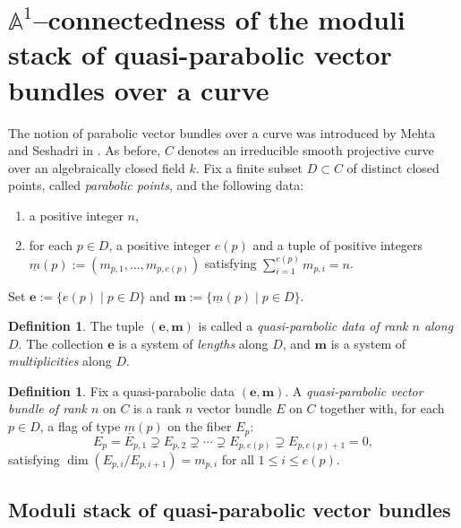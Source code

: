 \documentclass[12pt,reqno]{amsart}
\newcommand{\bb}[1]{\mathbb{#1}}
\theoremstyle{definition}
\newtheorem{definition}[theorem]{Definition}
\numberwithin{equation}{section}
\begin{document}
	\section{$\bb{A}^1$--connectedness of the moduli stack of quasi-parabolic
		vector bundles over a curve}
	\label{section:quasi-parabolic}
	
	The notion of parabolic vector bundles over a curve was introduced by Mehta
	and Seshadri in \cite{MS80}. As before, $C$ denotes an irreducible smooth
	projective curve over an algebraically closed field $k$. Fix a finite subset
	$D\subset C$ of distinct closed points, called \textit{parabolic points},
	and the following data:
	\begin{enumerate}[$\bullet$]
		\item a positive integer $n$,
		\item for each $p\in D$, a positive integer $e(p)$ and a tuple of positive
		integers $\underline{m}(p):=(m_{p,1},\ldots,\allowbreak  m_{p,e(p)})$
		satisfying $\sum\nolimits_{i=1}^{e(p)}m_{p,i} = n$.
	\end{enumerate}
	Set $\boldsymbol{e} :=\{e(p)\mid p\in D\}$ and
	$\boldsymbol{m} := \{\underline{m}(p)\mid p\in D\}$.
	
	\begin{definition}\label{def:quasi-parabolic-data}
		The tuple $(\boldsymbol{e,m})$ is called a \textit{quasi-parabolic data of
			rank $n$ along $D$}. The collection $\boldsymbol{e}$ is a system of
		\textit{lengths} along $D$, and $\boldsymbol{m}$ is a system of
		\textit{multiplicities} along $D$.
	\end{definition}
	
	\begin{definition}\label{def:quasi-parabolic-bundle}
		Fix a quasi-parabolic data $(\boldsymbol{e,m})$. A \textit{quasi-parabolic
			vector bundle of rank $n$} on $C$ is a rank $n$ vector bundle $E$ on $C$
		together with, for each $p\in D$, a flag of type $\underline{m}(p)$ on the
		fiber $E_p$:
		\[
		E_p = E_{p,1}\supsetneq E_{p,2}\supsetneq \cdots
		\supsetneq E_{p,e(p)} \supsetneq E_{p,e(p)+1} = 0,
		\]
		satisfying $\dim(E_{p,i}/E_{p,i+1})=m_{p,i}$ for all $1\leq i\leq e(p)$.
	\end{definition}
	
	\subsection{Moduli stack of quasi-parabolic vector bundles}
	
\end{document}
